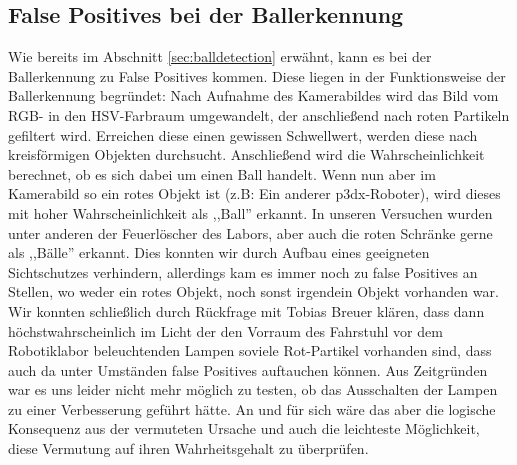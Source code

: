 
\subsection{False Positives bei der Ballerkennung}
\label{sec:false-positives-bei}
Wie bereits im Abschnitt \ref{sec:balldetection} erwähnt, kann es bei
der Ballerkennung zu False Positives kommen. Diese liegen in der
Funktionsweise der Ballerkennung begründet: Nach Aufnahme des
Kamerabildes wird das Bild vom RGB- in den HSV-Farbraum umgewandelt,
der anschließend nach roten Partikeln gefiltert wird. Erreichen diese
einen gewissen Schwellwert, werden diese nach kreisförmigen Objekten
durchsucht. Anschließend wird die Wahrscheinlichkeit berechnet, ob es
sich dabei um einen Ball handelt. Wenn nun aber im Kamerabild so ein
rotes Objekt ist (z.B: Ein anderer p3dx-Roboter), wird dieses mit
hoher Wahrscheinlichkeit als ,,Ball'' erkannt. In unseren Versuchen
wurden unter anderen der Feuerlöscher des Labors, aber auch die roten
Schränke gerne als ,,Bälle'' erkannt. Dies konnten wir durch Aufbau
eines geeigneten Sichtschutzes verhindern, allerdings kam es immer
noch zu false Positives an Stellen, wo weder ein rotes Objekt, noch
sonst irgendein Objekt vorhanden war. Wir konnten schließlich durch
Rückfrage mit Tobias Breuer klären, dass dann höchstwahrscheinlich im
Licht der den Vorraum des Fahrstuhl vor dem Robotiklabor beleuchtenden
Lampen soviele Rot-Partikel vorhanden sind, dass auch da unter
Umständen false Positives auftauchen können. Aus Zeitgründen war es
uns leider nicht mehr möglich zu testen, ob das Ausschalten der Lampen
zu einer Verbesserung geführt hätte. An und für sich wäre das aber die
logische Konsequenz aus der vermuteten Ursache und auch die leichteste
Möglichkeit, diese Vermutung auf ihren Wahrheitsgehalt zu überprüfen.

